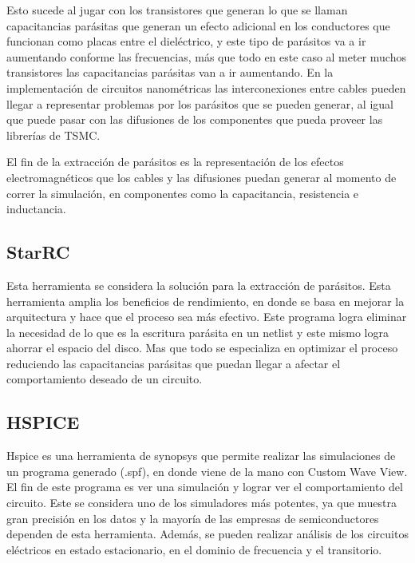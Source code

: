 Esto sucede al jugar con los transistores que generan lo que se llaman capacitancias parásitas que generan un efecto adicional en los conductores que funcionan como placas entre el dieléctrico, y este tipo de parásitos va a ir aumentando conforme las frecuencias, más que todo en este caso al meter muchos transistores las capacitancias parásitas van a ir aumentando.  En la implementación de circuitos nanométricas las interconexiones entre cables pueden llegar a representar problemas por los parásitos que se pueden generar, al igual que puede pasar con las difusiones de los componentes que pueda proveer las librerías de TSMC.

El fin de la extracción de parásitos es la representación de los efectos electromagnéticos que los cables y las difusiones puedan generar al momento de correr la simulación, en componentes como la capacitancia, resistencia e inductancia.

 \cite{charls} 

  \subsection*{StarRC}

Esta herramienta se considera la solución para la extracción de parásitos. Esta herramienta amplia los beneficios de rendimiento, en donde se basa en mejorar la arquitectura y hace que el proceso sea más efectivo. Este programa logra eliminar la necesidad de lo que es la escritura parásita en un netlist y este mismo logra ahorrar el espacio del disco. Mas que todo se especializa en optimizar el proceso reduciendo las capacitancias parásitas que puedan llegar a afectar el comportamiento deseado de un circuito.

 \cite{StarRc} 


\subsection*{HSPICE}
Hspice es una herramienta de synopsys que permite realizar las simulaciones de un programa generado (.spf), en donde viene de la mano con Custom Wave View. El fin de este programa es ver una simulación y lograr ver el comportamiento del circuito. 
Este se considera uno de los simuladores más potentes, ya que muestra gran precisión en los datos y la mayoría de las empresas de semiconductores dependen de esta herramienta.
Además, se pueden realizar análisis de los circuitos eléctricos en estado estacionario, en el dominio de frecuencia y el transitorio.



 \cite{charls} 


